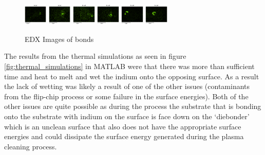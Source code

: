 \begin{figure}
    \includegraphics[width=0.1\textwidth]{Main/Ch2/extracted/Indium/In-EP-EDx_TLED-02-A1-s1_media_image7.png}
    \includegraphics[width=0.1\textwidth]{Main/Ch2/extracted/Indium/In-EP-EDx_TLED-02-A1-s2_media_image7.png}
    \includegraphics[width=0.1\textwidth]{Main/Ch2/extracted/Indium/In-EP-EDx_TLED-02-A2-s1_media_image7.png}
    \includegraphics[width=0.1\textwidth]{Main/Ch2/extracted/Indium/In-EP-EDx_TLED-02-A2-s2_media_image7.png}
    \includegraphics[width=0.1\textwidth]{Main/Ch2/extracted/Indium/In-EP-EDx_TLED-02-B2-s1_media_image7.png}
    \includegraphics[width=0.1\textwidth]{Main/Ch2/extracted/Indium/In-EP-EDx_TLED-02-B2-s2_media_image7.png}
    \caption{EDX Images of bonds}
    \label{fig:EDX_indium_2}
\end{figure}


The results from the thermal simulations as seen in figure \ref{fig:thermal_simulations} in MATLAB were that there was more than sufficient time and heat to melt and wet the indium onto the opposing surface. As a result the lack of wetting was likely a result of one of the other issues (contaminants from the flip-chip process or some failure in the surface energies).
Both of the other issues are quite possible as during the process the substrate that is bonding onto the substrate with indium on the surface is face down on the `diebonder' which is an unclean surface that also does not have the appropriate surface energies and could dissipate the surface energy generated during the plasma cleaning process.

